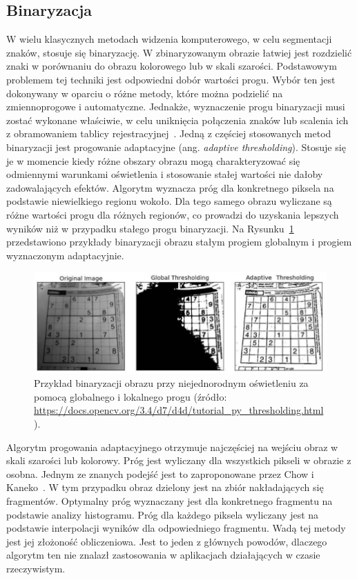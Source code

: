 \subsection{Binaryzacja}\label{subsec:binaryzacja}
W wielu klasycznych metodach widzenia komputerowego, w celu segmentacji znaków, stosuje się binaryzację.
W zbinaryzowanym obrazie łatwiej jest rozdzielić znaki w porównaniu do obrazu kolorowego lub w skali szarości.
Podstawowym problemem tej techniki jest odpowiedni dobór wartości progu.
Wybór ten jest dokonywany w oparciu o różne metody, które można podzielić na zmiennoprogowe i automatyczne.
Jednakże, wyznaczenie progu binaryzacji musi zostać wykonane właściwie, w celu uniknięcia połączenia znaków lub scalenia ich z obramowaniem tablicy rejestracyjnej~\cite{6213519}.
Jedną z częściej stosowanych metod binaryzacji jest progowanie adaptacyjne (ang. \textit{adaptive thresholding}).
Stosuje się je w momencie kiedy różne obszary obrazu mogą charakteryzować się odmiennymi warunkami oświetlenia i stosowanie stałej wartości nie dałoby zadowalających efektów.
Algorytm wyznacza próg dla konkretnego piksela na podstawie niewielkiego regionu wokoło.
Dla tego samego obrazu wyliczane są różne wartości progu dla różnych regionów, co prowadzi do uzyskania lepszych wyników niż w przypadku stałego progu binaryzacji.
Na Rysunku~\ref{fig:threshold} przedstawiono przykłady binaryzacji obrazu stałym progiem globalnym i progiem wyznaczonym adaptacyjnie.
\begin{figure}[!ht]
    \centering
    \includegraphics[scale=0.6]{Pictures/threshold}
    \caption{Przykład binaryzacji obrazu przy niejednorodnym oświetleniu za pomocą globalnego i lokalnego progu (źródło: \url{https://docs.opencv.org/3.4/d7/d4d/tutorial_py_thresholding.html}).}
    \label{fig:threshold}
\end{figure}
\FloatBarrier

Algorytm progowania adaptacyjnego otrzymuje najczęściej na wejściu obraz w skali szarości lub kolorowy.
Próg jest wyliczany dla wszystkich pikseli w obrazie z osobna.
Jednym ze znanych podejść jest to zaproponowane przez Chow i Kaneko~\cite{Chow1971BoundaryDO}.
W tym przypadku obraz dzielony jest na zbiór nakładających się fragmentów.
Optymalny próg wyznaczany jest dla konkretnego fragmentu na podstawie analizy histogramu.
Próg dla każdego piksela wyliczany jest na podstawie interpolacji wyników dla odpowiedniego fragmentu.
Wadą tej metody jest jej złożoność obliczeniowa.
Jest to jeden z głównych powodów, dlaczego algorytm ten nie znalazł zastosowania w aplikacjach działających \linebreak w czasie rzeczywistym.

